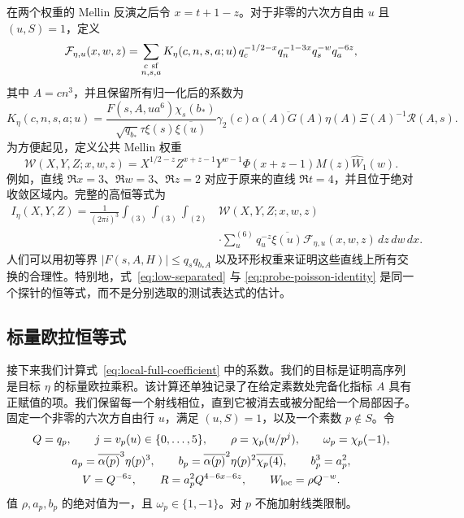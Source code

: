 \documentclass[11pt,a4paper]{article}
\numberwithin{equation}{section}
\numberwithin{figure}{section}
\theoremstyle{definition}
\theoremstyle{remark}
\begin{document}
在两个权重的 Mellin 反演之后令 $x=t+1-z$。对于非零的六次方自由 $u$ 且 $(u,S)=1$，定义
\begin{equation}\label{eq:local-full-series}
 \mathcal F_{\eta,u}(x,w,z)=
 \sum_{\substack{c\ {\rm sf}\\n,s,a}}
 K_\eta(c,n,s,a;u)\,
 q_c^{-1/2-x}q_n^{-1-3x}q_s^{-w}q_a^{-6z},
\end{equation}
其中 $A=cn^3$，并且保留所有归一化后的系数为
\begin{equation}\label{eq:local-full-coefficient}
 K_\eta(c,n,s,a;u)=
 \frac{F(s,A,ua^6)\chi_s(b_*)}
 {\sqrt{q_{b_*}}\tau\xi(s)\overline{\xi(u)}}
 \gamma_2(c)\overline{\alpha(A)G(A)}
 \eta(A)\Xi(A)^{-1}\mathcal R(A,s).
\end{equation}
为方便起见，定义公共 Mellin 权重
\[
 \mathcal W(X,Y,Z;x,w,z)=
 X^{1/2-z}Z^{x+z-1}Y^{w-1}
 \Phi(x+z-1)M(z)\widehat W_1(w).
\]
例如，直线 $\Re x=3$、$\Re w=3$、$\Re z=2$ 对应于原来的直线 $\Re t=4$，并且位于绝对收敛区域内。完整的高恒等式为
\begin{equation}\label{eq:probe-poisson-identity}
 \begin{split}
 I_\eta(X,Y,Z)=\frac1{(2\pi i)^3}
 \int_{(3)}\int_{(3)}\int_{(2)}
 &\mathcal W(X,Y,Z;x,w,z)\\
 &\cdot\sum_u^{(6)}q_u^{-z}\overline{\xi(u)}
             \mathcal F_{\eta,u}(x,w,z)\,dz\,dw\,dx.
 \end{split}
\end{equation}
人们可以用初等界 $|F(s,A,H)|\le q_sq_{b_*A}$ 以及环形权重来证明这些直线上所有交换的合理性。特别地，式~\eqref{eq:low-separated} 与 \eqref{eq:probe-poisson-identity} 是同一个探针的恒等式，而不是分别选取的测试表达式的估计。


\subsection{标量欧拉恒等式}
\label{sec:local-euler}

接下来我们计算式~\eqref{eq:local-full-coefficient} 中的系数。我们的目标是证明高序列是目标 $\eta$ 的标量欧拉乘积。该计算还单独记录了在给定素数处完备化指标 $A$ 具有正赋值的项。我们保留每一个射线相位，直到它被消去或被分配给一个局部因子。固定一个非零的六次方自由行 $u$，满足 $(u,S)=1$，以及一个素数
$p\notin S$。令
\begin{equation}\label{eq:local-parameters}
 \begin{gathered}
 Q=q_p,\qquad j=v_p(u)\in\{0,\ldots,5\},\qquad
 \rho=\chi_p(u/p^j),\qquad \omega_p=\chi_p(-1),\\
 a_p=\overline{\alpha(p)}^3\eta(p)^3,\qquad
 b_p=\overline{\alpha(p)}^2\eta(p)^2\overline{\chi_p(4)},
 \qquad b_p^3=a_p^2,\\
 V=Q^{-6z},\qquad R=a_p^2Q^{4-6x-6z},\qquad
 W_{\rm loc}=\rho Q^{-w}.
 \end{gathered}
\end{equation}
值 $\rho,a_p,b_p$ 的绝对值为一，且
$\omega_p\in\{1,-1\}$。对 $p$ 不施加射线类限制。
\end{document}
